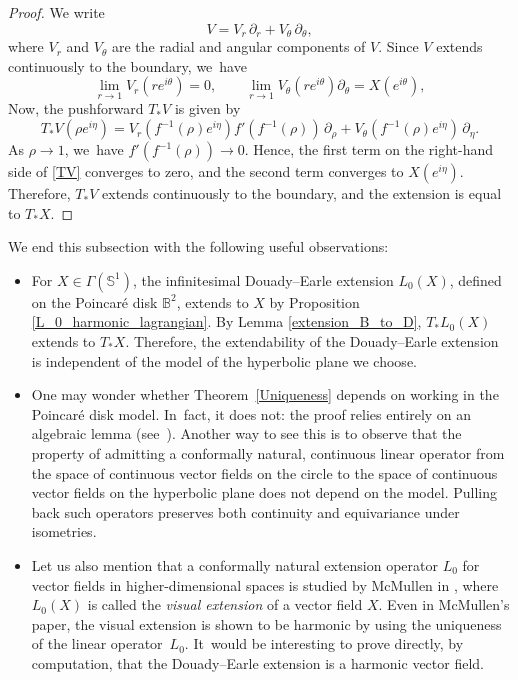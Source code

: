 \begin{proof}
We write
\[
V = V_r\, \partial_r + V_\theta\, \partial_\theta,
\]
where \(V_r\) and \(V_\theta\) are the radial and angular components of \(V\). Since \(V\) extends continuously to the boundary, we~have
\[
\lim_{r \to 1} V_r(re^{i\theta}) = 0, \qquad \lim_{r \to 1} V_\theta(re^{i\theta})\partial_{\theta} = X(e^{i\theta}),
\]
Now, the pushforward \(T_*V\) is given by
\begin{equation}\label{TV}
T_*V(\rho e^{i\eta}) = V_r(f^{-1}(\rho)e^{i\eta}) f'(f^{-1}(\rho))\, \partial_\rho + V_\theta(f^{-1}(\rho)e^{i\eta})\, \partial_\eta.
\end{equation}
As \(\rho \to 1\), we~have \(f'(f^{-1}(\rho)) \to 0\). Hence, the first term on the right-hand side of \eqref{TV} converges to zero, and the second term converges to \(X(e^{i\eta})\). Therefore, \(T_*V\) extends continuously to the boundary, and the extension is equal to \(T_*X\).
\end{proof}
\begin{remark}
We end this subsection with the following useful observations:
\begin{itemize}
\item For \(X \in \Gamma(\mathbb{S}^1)\), the infinitesimal Douady–Earle extension \(L_0(X)\), defined on the Poincaré disk \(\mathbb{B}^2\), extends to \(X\) by Proposition \ref{L_0_harmonic_lagrangian}. By Lemma \ref{extension_B_to_D}, \(T_*L_0(X)\) extends to \(T_*X\). Therefore, the extendability of the Douady–Earle extension is independent of the model of the hyperbolic plane we choose.

\item One may wonder whether Theorem~\ref{Uniqueness} depends on working in the Poincaré disk model. In~fact, it does not: the proof relies entirely on an algebraic lemma (see~\cite[\S 3]{Uniqueness_of_operator_L}). Another way to see this is to observe that the property of admitting a conformally natural, continuous linear operator from the space of continuous vector fields on the circle to the space of continuous vector fields on the hyperbolic plane does not depend on the model. Pulling back such operators preserves both continuity and equivariance under isometries.

\item Let us also mention that a conformally natural extension operator \(L_0\) for vector fields in higher-dimensional spaces is studied by McMullen in \cite[App.\,B]{mullen}, where \(L_0(X)\) is called the \emph{visual extension} of a vector field \(X\). Even in McMullen's paper, the visual extension is shown to be harmonic by using the uniqueness of the linear operator~\(L_0 \). It~would be interesting to prove directly, by computation, that the Douady–Earle extension is a harmonic vector field.
\end{itemize}
\end{remark}

